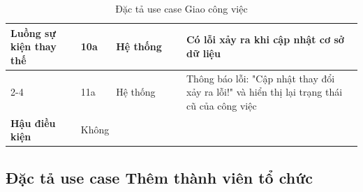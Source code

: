 \documentclass[../DoAn.tex]{subfiles}
\begin{document}
\begin{table}[ht]
\begin{tabular}{| p{0.2\linewidth} | p{0.1\linewidth} | p{0.2\linewidth} | p{0.5\linewidth} |}
        \multirow{4}{\linewidth}{\textbf{Luồng sự kiện thay thế}}    & \multicolumn{1}{p{0.1\linewidth}|}{10a}                                                            & \multicolumn{1}{p{0.2\linewidth}|}{Hệ thống}               & \multicolumn{1}{p{0.5\linewidth}|}{Có lỗi xảy ra khi cập nhật cơ sở dữ liệu}                                                   \\ \cline{2-4}
                                                                     & \multicolumn{1}{p{0.1\linewidth}|}{11a}                                                            & \multicolumn{1}{p{0.2\linewidth}|}{Hệ thống}               & \multicolumn{1}{p{0.5\linewidth}|}{Thông báo lỗi: "Cập nhật thay đổi xảy ra lỗi!" và hiển thị lại trạng thái cũ của công việc} \\ \hline

        \textbf{Hậu điều kiện}                                       & \multicolumn{3}{p{0.1\linewidth}|}{Không}                                                                                                                                                                                                                                                        \\ \hline
    \end{tabular}%
    \renewcommand{\arraystretch}{1}
    \caption{Đặc tả use case Giao công việc}
    \label{tab:UC04}
\end{table}

\newpage

\subsection{Đặc tả use case Thêm thành viên tổ chức}
\label{subsection:2.3.5}
\end{document}
